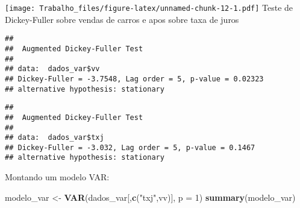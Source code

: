 \documentclass[
]{article}
\newenvironment{Shaded}{\begin{snugshade}}{\end{snugshade}}
\newcommand{\AttributeTok}[1]{\textcolor[rgb]{0.13,0.29,0.53}{#1}}
\newcommand{\DecValTok}[1]{\textcolor[rgb]{0.00,0.00,0.81}{#1}}
\newcommand{\FunctionTok}[1]{\textcolor[rgb]{0.13,0.29,0.53}{\textbf{#1}}}
\newcommand{\NormalTok}[1]{#1}
\newcommand{\OtherTok}[1]{\textcolor[rgb]{0.56,0.35,0.01}{#1}}
\newcommand{\SpecialCharTok}[1]{\textcolor[rgb]{0.81,0.36,0.00}{\textbf{#1}}}
\newcommand{\StringTok}[1]{\textcolor[rgb]{0.31,0.60,0.02}{#1}}
\begin{document}
\texttt{[image: Trabalho\_files/figure-latex/unnamed-chunk-12-1.pdf]}
Teste de Dickey-Fuller sobre vendas de carros e apos sobre taxa de juros

\begin{Shaded}
\end{Shaded}

\begin{verbatim}
## 
##  Augmented Dickey-Fuller Test
## 
## data:  dados_var$vv
## Dickey-Fuller = -3.7548, Lag order = 5, p-value = 0.02323
## alternative hypothesis: stationary
\end{verbatim}

\begin{Shaded}
\end{Shaded}

\begin{verbatim}
## 
##  Augmented Dickey-Fuller Test
## 
## data:  dados_var$txj
## Dickey-Fuller = -3.032, Lag order = 5, p-value = 0.1467
## alternative hypothesis: stationary
\end{verbatim}

Montando um modelo VAR:

\begin{Shaded}
\begin{Highlighting}[]
\NormalTok{modelo\_var }\OtherTok{\textless{}{-}} \FunctionTok{VAR}\NormalTok{(dados\_var[,}\FunctionTok{c}\NormalTok{(}\StringTok{"txj"}\NormalTok{,}\StringTok{\textquotesingle{}vv\textquotesingle{}}\NormalTok{)], }\AttributeTok{p =} \DecValTok{1}\NormalTok{)}
\FunctionTok{summary}\NormalTok{(modelo\_var)}
\end{Highlighting}
\end{Shaded}
\end{document}
